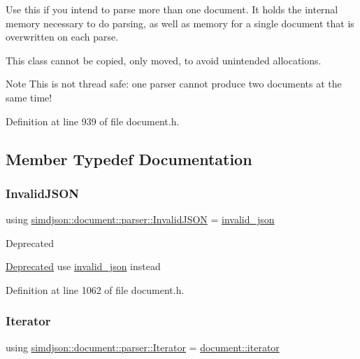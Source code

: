 Use this if you intend to parse more than one document. It holds the internal memory necessary to do parsing, as well as memory for a single document that is overwritten on each parse.

This class cannot be copied, only moved, to avoid unintended allocations.

\begin{DoxyNote}{Note}
This is not thread safe\+: one parser cannot produce two documents at the same time! 
\end{DoxyNote}


Definition at line 939 of file document.\+h.



\subsection{Member Typedef Documentation}
\mbox{\label{classsimdjson_1_1document_1_1parser_a26aa1a76e9ecf5371736aa44b5f6d74a}} 
\subsubsection{\texorpdfstring{Invalid\+J\+S\+ON}{InvalidJSON}}
{\footnotesize\ttfamily using \hyperlink{classsimdjson_1_1document_1_1parser_a26aa1a76e9ecf5371736aa44b5f6d74a}{simdjson\+::document\+::parser\+::\+Invalid\+J\+S\+ON} =  \hyperlink{structsimdjson_1_1invalid__json}{invalid\+\_\+json}}

\begin{DoxyRefDesc}{Deprecated}
\item[\hyperlink{deprecated__deprecated000002}{Deprecated}]use \hyperlink{structsimdjson_1_1invalid__json}{invalid\+\_\+json} instead \end{DoxyRefDesc}


Definition at line 1062 of file document.\+h.

\mbox{\label{classsimdjson_1_1document_1_1parser_af98e5ba546a37967e0bfee969d1d5f48}} 
\subsubsection{\texorpdfstring{Iterator}{Iterator}}
{\footnotesize\ttfamily using \hyperlink{classsimdjson_1_1document_1_1parser_af98e5ba546a37967e0bfee969d1d5f48}{simdjson\+::document\+::parser\+::\+Iterator} =  \hyperlink{classsimdjson_1_1document__iterator}{document\+::iterator}}

